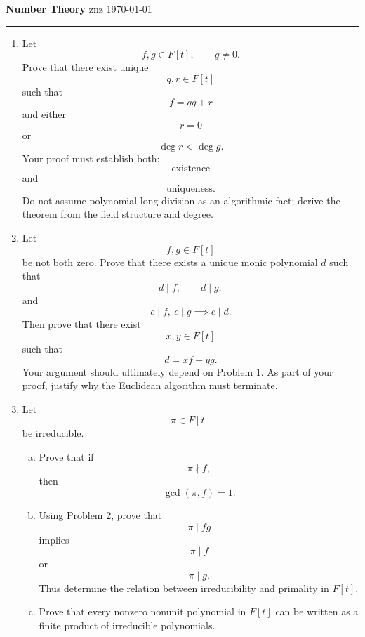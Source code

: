 \documentclass[12pt]{article}
\begin{document}
\noindent
{\large\bfseries Number Theory}
\hfill
znz
\quad
\today

\hrule
\medskip

\begin{enumerate}
  \item
        Let
        \[
        f,g\in F[t],
        \qquad
        g\neq0.
        \]Prove that there exist unique
        \[
        q,r\in F[t]
        \]such that
        \[
        f=qg+r
        \]and either
        \[
        r=0
        \]or
        \[
        \deg r<\deg g.
        \]Your proof must establish both:
        \[
        \text{existence}
        \]and
        \[
        \text{uniqueness}.
        \]
        Do not assume polynomial long division as an algorithmic fact; derive the theorem from the field structure and degree.
  \item
        Let
        \[
        f,g\in F[t]
        \]be not both zero.
        Prove that there exists a unique monic polynomial \(d\) such that
        \[
        d\mid f,\qquad d\mid g,
        \]and
        \[
        c\mid f,\ c\mid g
        \implies
        c\mid d.
        \]Then prove that there exist
        \[
        x,y\in F[t]
        \]such that
        \[
        \boxed{d=xf+yg.}
        \]Your argument should ultimately depend on Problem 1.
        As part of your proof, justify why the Euclidean algorithm must terminate.
  \item
        Let
        \[
        \pi\in F[t]
        \]be irreducible.

        \begin{enumerate}[(a)]
          \item
                Prove that if
                \[
                \pi\nmid f,
                \]then
                \[
                \gcd(\pi,f)=1.
                \]
          \item
                Using Problem 2, prove that
                \[
                \pi\mid fg
                \]implies
                \[
                \pi\mid f
                \]or
                \[
                \pi\mid g.
                \]Thus determine the relation between irreducibility and primality in \(F[t]\).
          \item
                Prove that every nonzero nonunit polynomial in \(F[t]\) can be written as a finite product of irreducible polynomials.


\end{enumerate}
\end{enumerate}
\end{document}
